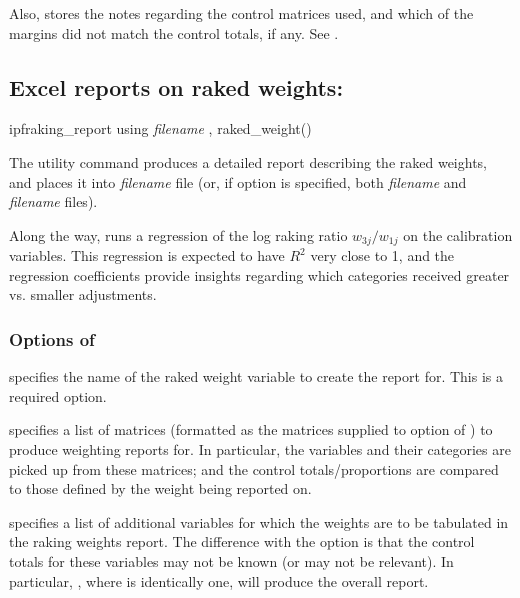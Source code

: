 Also,  stores the notes regarding the control matrices
used, and which of the margins did not match the control totals, if any.
See .

\subsection{Excel reports on raked weights:  }

\begin{stsyntax}
ipfraking\_report
using \textit{filename}
,
raked\_weight(\varname)
\end{stsyntax}

The utility command  produces a detailed report
describing the raked weights, and places it into \textit{filename} file
(or, if  option is specified, both \textit{filename} and \textit{filename}
files).

Along the way,  runs a regression of the log raking ratio $w_{3j}/w_{1j}$
on the calibration variables. This regression is expected to have $R^2$ very close to 1,
and the regression coefficients provide insights regarding which categories received
greater vs. smaller adjustments.

\cnp

\begin{stlog}
\nullskip
\end{stlog}

\subsubsection{Options of }

\hangpara
{} specifies the name of the raked weight variable to create
    the report for. This is a required option.

\hangpara
{} specifies a list of matrices (formatted as the matrices
    supplied to  option of ) to produce weighting reports for.
    In particular, the variables and their categories are picked up from these matrices;
    and the control totals/proportions are compared to those defined by the weight being reported on.

\hangpara
{} specifies a list of additional variables for which the weights are to
    be tabulated in the raking weights report. The difference with the  option
    is that the control totals for these variables may not be known (or may not be relevant).
    In particular, , where  is identically one, will produce
    the overall report.

